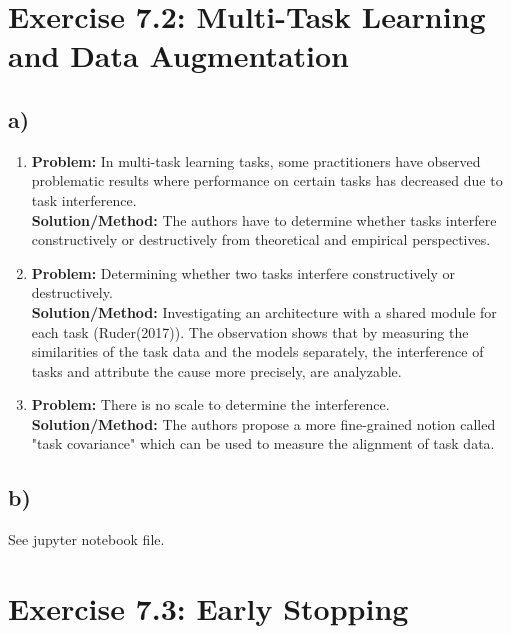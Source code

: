 \documentclass[a4paper]{article}
\begin{document}
\newpage
\section*{Exercise 7.2: Multi-Task Learning and Data Augmentation}
    \subsection*{a)}
        \begin{enumerate}
            \item \textbf{Problem:}
                    In multi-task learning tasks, some practitioners have observed problematic results where performance on certain tasks has decreased due to task interference.\\
                \textbf{Solution/Method:}
                    The authors have to determine whether tasks interfere constructively or destructively from theoretical and empirical perspectives.

            \item \textbf{Problem:}
                    Determining whether two tasks interfere constructively or destructively.\\
                \textbf{Solution/Method:}
                    Investigating an architecture with a shared module for each task (Ruder(2017)).
                    The observation shows that by measuring the similarities of the task data and the models separately, the interference of tasks and attribute the cause more precisely, are analyzable.

            \item \textbf{Problem:}
                    There is no scale to determine the interference.\\
                \textbf{Solution/Method:}
                    The authors propose a more fine-grained notion called "task covariance" which can be used to measure the alignment of task data.
        \end{enumerate}
    
    \subsection*{b)}
        See jupyter notebook file.



\newpage
\section*{Exercise 7.3: Early Stopping}
\end{document}
